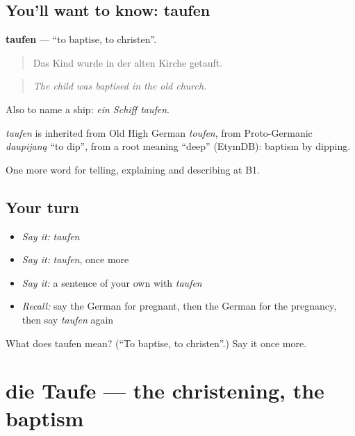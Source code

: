\subsection*{You'll want to know: taufen}
\textbf{taufen} — \textquotedblleft{}to baptise, to christen\textquotedblright{}.

\begin{quote}
Das Kind wurde in der alten Kirche getauft.
\end{quote}

\begin{quote}
\emph{The child was baptised in the old church.}
\end{quote}

Also to name a ship: \emph{ein Schiff taufen}.

\begin{cousinweb}
\emph{taufen} is inherited from Old High German \emph{toufen}, from Proto-Germanic \emph{daupijaną} \textquotedblleft{}to dip\textquotedblright{}, from a root meaning \textquotedblleft{}deep\textquotedblright{} (EtymDB): baptism by dipping.
\end{cousinweb}

\begin{grammarlens}[title={What you've built}]
One more word for telling, explaining and describing at B1.
\end{grammarlens}

\subsection*{Your turn}
\begin{itemize}
\raggedright
  \item \emph{Say it:} \emph{taufen}
  \item \emph{Say it:} \emph{taufen}, once more
  \item \emph{Say it:} a sentence of your own with \emph{taufen}
  \item \emph{Recall:} say the German for pregnant, then the German for the pregnancy, then say \emph{taufen} again
\end{itemize}

\begin{tcolorbox}[breakable,colback=teal!4,colframe=teal!35!black,title={Before you move on}]
What does taufen mean? (\textquotedblleft{}To baptise, to christen\textquotedblright{}.) Say it once more.
\end{tcolorbox}
\section[die Taufe]{die Taufe — the christening, the baptism}

